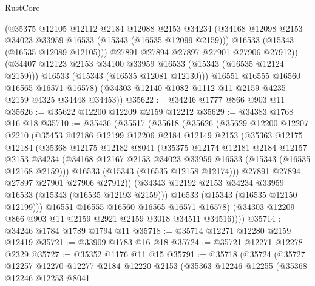 \begin{lexlean}{RustCore}
\begin{coremodule}
              (@35375
                @12105
                @12112
                @2184
                @12088
                @2153
                @34234
                (@34168 @12098 @2153 @34023 @33959 @16533 (@15343 (@16535 @12099 @2159)))
                @16533
                (@15343 (@16535 @12089 @12105)))
              @27891
              @27894
              @27897
              @27901
              @27906
              @27912))
          (@34407 @12123 @2153 @34100 @33959 @16533 (@15343 (@16535 @12124 @2159)))
          @16533
          (@15343 (@16535 @12081 @12130)))
        @16551
        @16555
        @16560
        @16565
        @16571
        @16578)
      (@34303 @12140 @1082 @1112 @11 @2159 @4235 @2159 @4325 @34448 @34453))
@35622 := @34246 @1777 @866 @903 @11
@35626 := @35622 @12200 @12209 @2159 @12212
@35629 := @34383 @1768 @16 @18
@35710 := @35436
    (@35517
      (@35618
        (@35626
          (@35629
            @12200
            @12207
            @2210
            (@35453
              @12186
              @12199
              @12206
              @2184
              @12149
              @2153
              (@35363
                @12175
                @12184
                (@35368
                  @12175
                  @12182
                  @8041
                  (@35375
                    @12174
                    @12181
                    @2184
                    @12157
                    @2153
                    @34234
                    (@34168 @12167 @2153 @34023 @33959 @16533 (@15343 (@16535 @12168 @2159)))
                    @16533
                    (@15343 (@16535 @12158 @12174)))
                  @27891
                  @27894
                  @27897
                  @27901
                  @27906
                  @27912))
              (@34343 @12192 @2153 @34234 @33959 @16533 (@15343 (@16535 @12193 @2159)))
              @16533
              (@15343 (@16535 @12150 @12199)))
            @16551
            @16555
            @16560
            @16565
            @16571
            @16578)
          (@34303 @12209 @866 @903 @11 @2159 @2921 @2159 @3018 @34511 @34516))))
@35714 := @34246 @1784 @1789 @1794 @11
@35718 := @35714 @12271 @12280 @2159 @12419
@35721 := @33909 @1783 @16 @18
@35724 := @35721 @12271 @12278 @2329
@35727 := @35352 @1176 @11 @15
@35791 := @35718
    (@35724
      (@35727
        @12257
        @12270
        @12277
        @2184
        @12220
        @2153
        (@35363
          @12246
          @12255
          (@35368
            @12246
            @12253
            @8041

\end{coremodule}
\end{lexlean}
